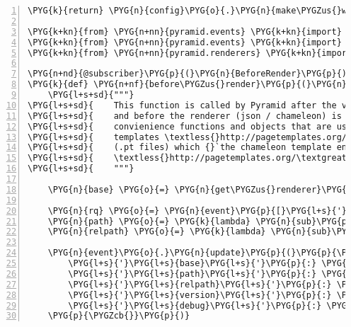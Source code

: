 \begin{Verbatim}[commandchars=\\\{\},numbers=left,firstnumber=1,stepnumber=5]
    \PYG{k}{return} \PYG{n}{config}\PYG{o}{.}\PYG{n}{make\PYGZus{}wsgi\PYGZus{}app}\PYG{p}{(}\PYG{p}{)}

\PYG{k+kn}{from} \PYG{n+nn}{pyramid.events} \PYG{k+kn}{import} \PYG{n}{subscriber}
\PYG{k+kn}{from} \PYG{n+nn}{pyramid.events} \PYG{k+kn}{import} \PYG{n}{BeforeRender}
\PYG{k+kn}{from} \PYG{n+nn}{pyramid.renderers} \PYG{k+kn}{import} \PYG{n}{get\PYGZus{}renderer}

\PYG{n+nd}{@subscriber}\PYG{p}{(}\PYG{n}{BeforeRender}\PYG{p}{)}
\PYG{k}{def} \PYG{n+nf}{before\PYGZus{}render}\PYG{p}{(}\PYG{n}{event}\PYG{p}{)}\PYG{p}{:}
    \PYG{l+s+sd}{"""}
\PYG{l+s+sd}{    This function is called by Pyramid after the view callable has returned}
\PYG{l+s+sd}{    and before the renderer (json / chameleon) is called. We inject some}
\PYG{l+s+sd}{    convienience functions and objects that are used in the {}`zope page}
\PYG{l+s+sd}{    templates \textless{}http://pagetemplates.org/docs/latest/reference.html\textgreater{}{}`\PYGZus{}}
\PYG{l+s+sd}{    (.pt files) which {}`the chameleon template engine}
\PYG{l+s+sd}{    \textless{}http://pagetemplates.org/\textgreater{}{}`\PYGZus{} then renders.}
\PYG{l+s+sd}{    """}

    \PYG{n}{base} \PYG{o}{=} \PYG{n}{get\PYGZus{}renderer}\PYG{p}{(}\PYG{l+s}{'}\PYG{l+s}{templates/base.pt}\PYG{l+s}{'}\PYG{p}{)}\PYG{o}{.}\PYG{n}{implementation}\PYG{p}{(}\PYG{p}{)}

    \PYG{n}{rq} \PYG{o}{=} \PYG{n}{event}\PYG{p}{[}\PYG{l+s}{'}\PYG{l+s}{request}\PYG{l+s}{'}\PYG{p}{]}
    \PYG{n}{path} \PYG{o}{=} \PYG{k}{lambda} \PYG{n}{sub}\PYG{p}{:} \PYG{n}{rq}\PYG{o}{.}\PYG{n}{route\PYGZus{}path}\PYG{p}{(}\PYG{l+s}{'}\PYG{l+s}{home}\PYG{l+s}{'}\PYG{p}{)} \PYG{o}{+} \PYG{n}{sub}
    \PYG{n}{relpath} \PYG{o}{=} \PYG{k}{lambda} \PYG{n}{sub}\PYG{p}{:} \PYG{n}{rq}\PYG{o}{.}\PYG{n}{current\PYGZus{}route\PYGZus{}path}\PYG{p}{(}\PYG{p}{)} \PYG{o}{+} \PYG{l+s}{'}\PYG{l+s}{/}\PYG{l+s}{'} \PYG{o}{+} \PYG{n}{sub}

    \PYG{n}{event}\PYG{o}{.}\PYG{n}{update}\PYG{p}{(}\PYG{p}{\PYGZob{}}
        \PYG{l+s}{'}\PYG{l+s}{base}\PYG{l+s}{'}\PYG{p}{:} \PYG{n}{base}\PYG{p}{,}
        \PYG{l+s}{'}\PYG{l+s}{path}\PYG{l+s}{'}\PYG{p}{:} \PYG{n}{path}\PYG{p}{,}
        \PYG{l+s}{'}\PYG{l+s}{relpath}\PYG{l+s}{'}\PYG{p}{:} \PYG{n}{relpath}\PYG{p}{,}
        \PYG{l+s}{'}\PYG{l+s}{version}\PYG{l+s}{'}\PYG{p}{:} \PYG{n}{rnaseqlyze}\PYG{o}{.}\PYG{n}{\PYGZus{}\PYGZus{}version\PYGZus{}\PYGZus{}}\PYG{p}{,}
        \PYG{l+s}{'}\PYG{l+s}{debug}\PYG{l+s}{'}\PYG{p}{:} \PYG{n}{log}\PYG{o}{.}\PYG{n}{getEffectiveLevel}\PYG{p}{(}\PYG{p}{)} \PYG{o}{\textless{}}\PYG{o}{=} \PYG{n}{logging}\PYG{o}{.}\PYG{n}{DEBUG}\PYG{p}{,}
    \PYG{p}{\PYGZcb{}}\PYG{p}{)}
\end{Verbatim}


